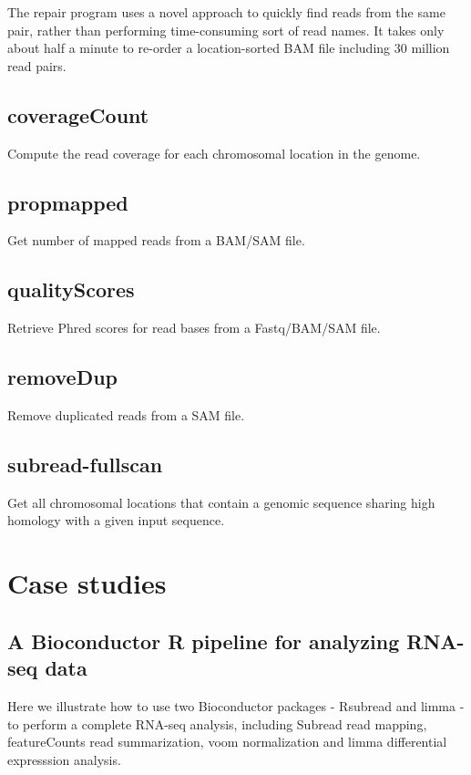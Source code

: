 \documentclass[12pt]{report}
\newcommand{\Subread}{\textsf{Subread}}
\newcommand{\Rsubread}{\textsf{Rsubread}}
\newcommand{\limma}{\textsf{limma}}
\newcommand{\voom}{\textsf{voom}}
\newcommand{\featureCounts}{\textsf{featureCounts}}
\newcommand{\repair}{\textsf{repair}}
\begin{document}
The {\repair} program uses a novel approach to quickly find reads from the same pair, rather than performing time-consuming sort of read names.
It takes only about half a minute to re-order a location-sorted BAM file including 30 million read pairs.

\section{coverageCount}

Compute the read coverage for each chromosomal location in the genome.

\section{propmapped}

Get number of mapped reads from a BAM/SAM file.

\section{qualityScores}

Retrieve Phred scores for read bases from a Fastq/BAM/SAM file.

\section{removeDup}

Remove duplicated reads from a SAM file.


\section{subread-fullscan}

Get all chromosomal locations that contain a genomic sequence sharing high homology with a given input sequence.



\chapter{Case studies}

\section{A Bioconductor R pipeline for analyzing RNA-seq data}

Here we illustrate how to use two Bioconductor packages - {\Rsubread} and {\limma} - to perform a complete RNA-seq analysis, including {\Subread} read mapping, {\featureCounts} read summarization, {\voom} normalization and {\limma} differential expresssion analysis.\\
\end{document}
